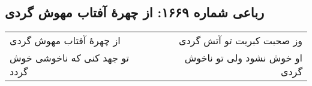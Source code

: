 \begin{center}
\section*{رباعی شماره ۱۶۶۹: از چهرهٔ آفتاب مهوش گردی}
\label{sec:1669}
\begin{longtable}{l p{0.5cm} r}
از چهرهٔ آفتاب مهوش گردی
&&
وز صحبت کبریت تو آتش گردی
\\
تو جهد کنی که ناخوشی خوش گردد
&&
او خوش نشود ولی تو ناخوش گردی
\\
\end{longtable}
\end{center}
